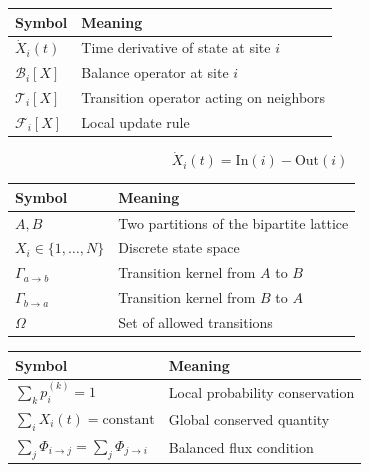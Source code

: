 \begin{table}[h!]
\vspace{1em}

\begin{tabular}{ll}
\hline
\textbf{Symbol} & \textbf{Meaning} \\
\hline
$\dot{X}_i(t)$ & Time derivative of state at site $i$ \\
$\mathcal{B}_i[X]$ & Balance operator at site $i$ \\
$\mathcal{T}_i[X]$ & Transition operator acting on neighbors \\
$\mathcal{F}_i[X]$ & Local update rule \\
\hline
\end{tabular}



\[
\dot{X}_i(t) = \mathrm{In}(i) - \mathrm{Out}(i)
\]



\vspace{1em}

\begin{tabular}{ll}
\hline
\textbf{Symbol} & \textbf{Meaning} \\
\hline
$A,B$ & Two partitions of the bipartite lattice \\
$X_i \in \{1,\dots,N\}$ & Discrete state space \\
$\Gamma_{a\to b}$ & Transition kernel from $A$ to $B$ \\
$\Gamma_{b\to a}$ & Transition kernel from $B$ to $A$ \\
$\Omega$ & Set of allowed transitions \\
\hline
\end{tabular}

\vspace{1em}

\begin{tabular}{ll}
\hline
\textbf{Symbol} & \textbf{Meaning} \\
\hline
$\sum_k p_i^{(k)} = 1$ & Local probability conservation \\
$\sum_i X_i(t) = \text{constant}$ & Global conserved quantity \\
$\sum_j \Phi_{i\to j} = \sum_j \Phi_{j\to i}$ & Balanced flux condition \\
\hline
\end{tabular}

\end{table}
